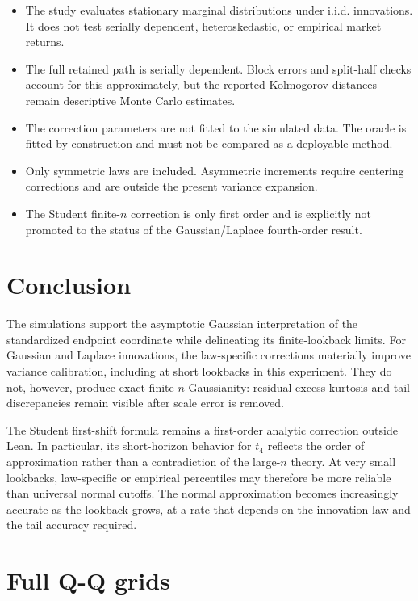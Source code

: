 \documentclass[10pt]{article}
\begin{document}
\begin{itemize}
\item The study evaluates stationary marginal distributions under i.i.d.
      innovations.  It does not test serially dependent, heteroskedastic, or
      empirical market returns.
\item The full retained path is serially dependent.  Block errors and
      split-half checks account for this approximately, but the reported
      Kolmogorov distances remain descriptive Monte Carlo estimates.
\item The correction parameters are not fitted to the simulated data.  The
      oracle is fitted by construction and must not be compared as a deployable
      method.
\item Only symmetric laws are included.  Asymmetric increments require
      centering corrections and are outside the present variance expansion.
\item The Student finite-\(n\) correction is only first order and is explicitly
      not promoted to the status of the Gaussian/Laplace fourth-order result.
\end{itemize}

\section{Conclusion}

The simulations support the asymptotic Gaussian interpretation of the
standardized endpoint coordinate while delineating its finite-lookback limits.
For Gaussian and Laplace innovations, the law-specific corrections materially
improve variance calibration, including at short lookbacks in this experiment.
They do not, however, produce exact finite-\(n\) Gaussianity: residual excess
kurtosis and tail discrepancies remain visible after scale error is removed.

The Student first-shift formula remains a first-order analytic correction
outside Lean.  In particular, its short-horizon behavior for \(t_4\) reflects the
order of approximation rather than a contradiction of the large-\(n\) theory.
At very small lookbacks, law-specific or empirical percentiles may therefore
be more reliable than universal normal cutoffs.  The normal approximation
becomes increasingly accurate as the lookback grows, at a rate that depends on
the innovation law and the tail accuracy required.

\clearpage
\appendix
\section{Full Q-Q grids}
\label{app:qq}
\end{document}
